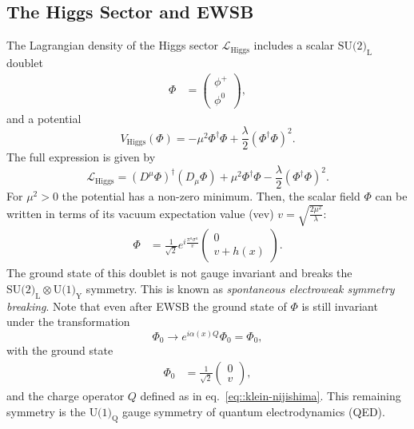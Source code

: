 \documentclass[a4paper,12pt]{book}
\begin{document}
\subsection{The Higgs Sector and EWSB}
The Lagrangian density of the Higgs sector $\mathcal{L}_\text{Higgs}$ includes a scalar $\text{SU(2)}_\text{L}$ doublet 
  \begin{align}
    \Phi &= \begin{pmatrix}
           \phi^+ \\
           \phi^0 
         \end{pmatrix},
  \end{align}
and a potential 
\begin{equation}
V_\text{Higgs}(\Phi) = -\mu^2 \Phi^\dagger \Phi + \frac{\lambda}{2} \left(\Phi^\dagger \Phi\right)^2.
\end{equation} 
The full expression is given by 
\begin{equation}
\label{eq::Lhiggs}
\mathcal{L}_\text{Higgs} = (D^\mu\Phi)^\dagger (D_\mu\Phi) + \mu^2 \Phi^\dagger \Phi - \frac{\lambda}{2} \left(\Phi^\dagger \Phi\right)^2.
\end{equation}
For $\mu^2>0$ the potential has a non-zero minimum. Then, the scalar field $\Phi$ can be written in terms of its vacuum expectation value (vev) $v = \sqrt{\frac{2\mu^2}{\lambda}}$: 
\begin{align}
\label{eq::scalarSU2doublet}
    \Phi &= \frac{1}{\sqrt{2}}e^{i\frac{\pi^a \sigma^a}{v}} \begin{pmatrix}
           0 \\
           v+h(x) 
         \end{pmatrix}.
\end{align}
The ground state of this doublet is not gauge invariant and breaks the $\text{SU(2)}_{ \text{L}} \otimes \text{U(1)}_{ \text{Y}}$ symmetry. This is known as \textit{spontaneous electroweak symmetry breaking}. Note that even after EWSB the ground state of $\Phi$ is still invariant under the transformation 
\begin{equation}
\Phi_0 \rightarrow e^{i\alpha(x)Q}\Phi_0 = \Phi_0,
\end{equation}
with the ground state 
\begin{align}
    \Phi_0 &= \frac{1}{\sqrt{2}}\begin{pmatrix}
           0 \\
           v 
         \end{pmatrix},
\end{align}
and the charge operator $Q$ defined as in eq.\ \eqref{eq::klein-nijishima}. This remaining symmetry is the $\text{U(1)}_\text{Q}$ gauge symmetry of quantum electrodynamics (QED).\par
\end{document}
